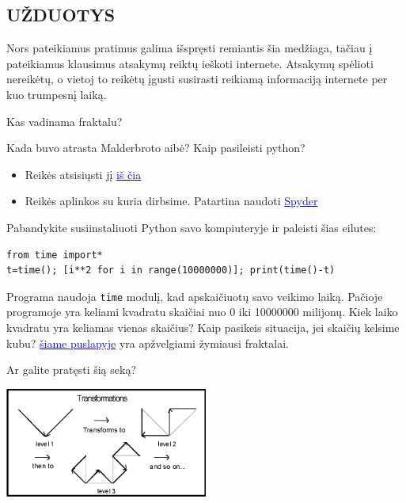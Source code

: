 \documentclass[a4paper]{article}
\renewenvironment{framed}[1][\hsize]
   {\MakeFramed{\hsize#1\advance\hsize-\width \FrameRestore}}%
   {\endMakeFramed}
\newcommand{\goto}[2]{\href{\detokenize{#1}}{\textcolor{blue}{#2}}}
\begin{document}
\subsection*{UŽDUOTYS}
Nors pateikiamus pratimus galima išspręsti remiantis šia medžiaga, tačiau į pateikiamus klausimus atsakymų reiktų ieškoti internete. Atsakymų spėlioti nereikėtų, o vietoj to reikėtų įgusti susirasti reikiamą informaciją internete per kuo trumpesnį laiką.
\begin{enumerate}
\begin{minipage}[b]{0.65\textwidth}
\item Kas vadinama fraktalu?
\item Kada buvo atrasta Malderbroto aibė?
\begin{framed}
Kaip pasileisti python?
\begin{itemize}
\item Reikės atsisiųsti jį \goto{https://www.python.org/downloads/}{iš čia}
\item Reikės aplinkos su kuria dirbsime. Patartina naudoti \goto{https://www.spyder-ide.org/}{Spyder}
\end{itemize}
\end{framed}
\item Pabandykite susiinstaliuoti Python savo kompiuteryje ir paleisti šias eilutes:
\begin{verbatim}
from time import*
t=time(); [i**2 for i in range(10000000)]; print(time()-t)
\end{verbatim}
Programa naudoja \texttt{time} modulį, kad apskaičiuotų savo veikimo laiką. Pačioje programoje yra keliami kvadratu skaičiai nuo 0 iki 10000000 milijonų. Kiek laiko kvadratu yra keliamas vienas skaičius? Kaip pasikeis situacija, jei skaičių kelsime kubu?
\begin{framed}
\goto{https://www.wahl.org/fe/HTML_version/link/FE3W/c3.htm}{šiame puslapyje} yra apžvelgiami žymiausi fraktalai.
\end{framed}
\item Ar galite pratęsti šią seką?

\includegraphics[width=0.5\textwidth]{dragonsteps.png}


\end{minipage}
\end{enumerate}
\end{document}
